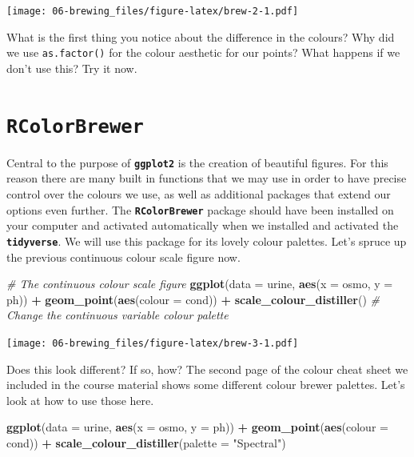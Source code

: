 \documentclass[]{book}
\newenvironment{Shaded}{\begin{snugshade}}{\end{snugshade}}
\newcommand{\KeywordTok}[1]{\textcolor[rgb]{0.13,0.29,0.53}{\textbf{#1}}}
\newcommand{\DataTypeTok}[1]{\textcolor[rgb]{0.13,0.29,0.53}{#1}}
\newcommand{\StringTok}[1]{\textcolor[rgb]{0.31,0.60,0.02}{#1}}
\newcommand{\CommentTok}[1]{\textcolor[rgb]{0.56,0.35,0.01}{\textit{#1}}}
\newcommand{\OperatorTok}[1]{\textcolor[rgb]{0.81,0.36,0.00}{\textbf{#1}}}
\newcommand{\NormalTok}[1]{#1}
\theoremstyle{definition}
\theoremstyle{definition}
\theoremstyle{definition}
\theoremstyle{remark}
\begin{document}
\texttt{[image: 06-brewing\_files/figure-latex/brew-2-1.pdf]}

What is the first thing you notice about the difference in the colours?
Why did we use \texttt{as.factor()} for the colour aesthetic for our
points? What happens if we don't use this? Try it now.

\section{\texorpdfstring{\textbf{\texttt{RColorBrewer}}}{RColorBrewer}}\label{rcolorbrewer}

Central to the purpose of \textbf{\texttt{ggplot2}} is the creation of
beautiful figures. For this reason there are many built in functions
that we may use in order to have precise control over the colours we
use, as well as additional packages that extend our options even
further. The \textbf{\texttt{RColorBrewer}} package should have been
installed on your computer and activated automatically when we installed
and activated the \textbf{\texttt{tidyverse}}. We will use this package
for its lovely colour palettes. Let's spruce up the previous continuous
colour scale figure now.

\begin{Shaded}
\begin{Highlighting}[]
\CommentTok{# The continuous colour scale figure}
\KeywordTok{ggplot}\NormalTok{(}\DataTypeTok{data =}\NormalTok{ urine, }\KeywordTok{aes}\NormalTok{(}\DataTypeTok{x =}\NormalTok{ osmo, }\DataTypeTok{y =}\NormalTok{ ph)) }\OperatorTok{+}
\StringTok{  }\KeywordTok{geom_point}\NormalTok{(}\KeywordTok{aes}\NormalTok{(}\DataTypeTok{colour =}\NormalTok{ cond)) }\OperatorTok{+}
\StringTok{  }\KeywordTok{scale_colour_distiller}\NormalTok{() }\CommentTok{# Change the continuous variable colour palette}
\end{Highlighting}
\end{Shaded}

\texttt{[image: 06-brewing\_files/figure-latex/brew-3-1.pdf]}

Does this look different? If so, how? The second page of the colour
cheat sheet we included in the course material shows some different
colour brewer palettes. Let's look at how to use those here.

\begin{Shaded}
\begin{Highlighting}[]
\KeywordTok{ggplot}\NormalTok{(}\DataTypeTok{data =}\NormalTok{ urine, }\KeywordTok{aes}\NormalTok{(}\DataTypeTok{x =}\NormalTok{ osmo, }\DataTypeTok{y =}\NormalTok{ ph)) }\OperatorTok{+}
\StringTok{  }\KeywordTok{geom_point}\NormalTok{(}\KeywordTok{aes}\NormalTok{(}\DataTypeTok{colour =}\NormalTok{ cond)) }\OperatorTok{+}
\StringTok{  }\KeywordTok{scale_colour_distiller}\NormalTok{(}\DataTypeTok{palette =} \StringTok{"Spectral"}\NormalTok{)}
\end{Highlighting}
\end{Shaded}
\end{document}
